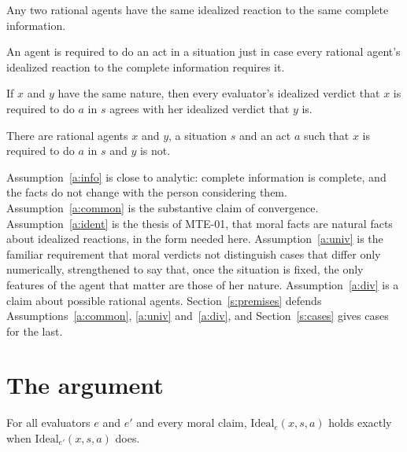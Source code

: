 \documentclass{situationist-preprint}
\begin{document}
\begin{assumption}\label{a:common}
Any two rational agents have the same idealized reaction to the same complete information.
\end{assumption}

\begin{assumption}[Identification]\label{a:ident}
An agent is required to do an act in a situation just in case every rational agent's idealized reaction to the complete information requires it.
\end{assumption}

\begin{assumption}\label{a:univ}
If $x$ and $y$ have the same nature, then every evaluator's idealized verdict that $x$ is required to do $a$ in $s$ agrees with her idealized verdict that $y$ is.
\end{assumption}

\begin{assumption}[Diversity]\label{a:div}
There are rational agents $x$ and $y$, a situation $s$ and an act $a$ such that $x$ is required to do $a$ in $s$ and $y$ is not.
\end{assumption}

Assumption~\ref{a:info} is close to analytic: complete information is complete, and the facts do not change with the person considering them. Assumption~\ref{a:common} is the substantive claim of convergence. Assumption~\ref{a:ident} is the thesis of MTE-01, that moral facts are natural facts about idealized reactions, in the form needed here. Assumption~\ref{a:univ} is the familiar requirement that moral verdicts not distinguish cases that differ only numerically, strengthened to say that, once the situation is fixed, the only features of the agent that matter are those of her nature. Assumption~\ref{a:div} is a claim about possible rational agents. Section~\ref{s:premises} defends Assumptions~\ref{a:common}, \ref{a:univ} and~\ref{a:div}, and Section~\ref{s:cases} gives cases for the last.

\section{The argument}\label{s:argument}

\begin{lemma}\label{l:inv}
For all evaluators $e$ and $e'$ and every moral claim, $\mathrm{Ideal}_e(x,s,a)$ holds exactly when $\mathrm{Ideal}_{e'}(x,s,a)$ does.
\end{lemma}
\end{document}
